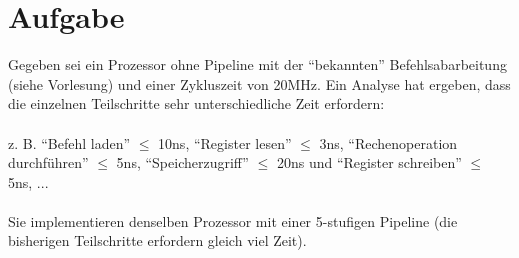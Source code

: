 \documentclass[10pt]{article}
\begin{document}
\section{Aufgabe}
Gegeben sei ein Prozessor ohne Pipeline mit der "`bekannten"' Befehlsabarbeitung (siehe Vorlesung) und einer Zykluszeit von 20MHz. Ein Analyse hat ergeben, dass die einzelnen Teilschritte sehr unterschiedliche Zeit erfordern:\\\\
z. B. "`Befehl laden"' $\leq$ 10ns, "`Register lesen"' $\leq$ 3ns, "`Rechenoperation durchführen"' $\leq$ 5ns, "`Speicherzugriff"' $\leq$ 20ns und "`Register schreiben"' $\leq$ 5ns, ... \\\\
Sie implementieren denselben Prozessor mit einer 5-stufigen Pipeline (die bisherigen Teilschritte erfordern gleich viel Zeit). 
\end{document}
